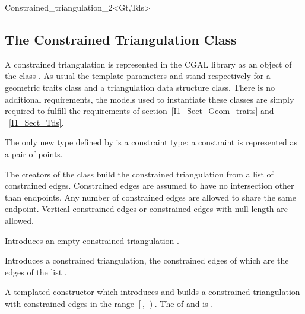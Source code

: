\begin{ccClassTemplate} {Constrained_triangulation_2<Gt,Tds>}
\subsection{ The Constrained Triangulation  Class}
A constrained triangulation is represented in the CGAL library as an
object of the class \ccClassTemplateName .
As usual the template parameters  and 
stand respectively for a geometric traits class and
a triangulation data structure class. There is no additional
requirements,
the models used to instantiate these classes are simply required
to fulfill the requirements 
of section~\ref{I1_Sect_Geom_traits} and ~\ref{I1_Sect_Tds}.

 
\ccInheritsFrom


\ccTypes
{}
\ccThreeToTwo
The only new type defined by
\ccClassTemplateName is a constraint type: a
constraint is represented as a pair of points.


\ccCreation
{}

The creators of the class build the constrained triangulation from a
list of constrained edges. Constrained edges are assumed to have no
intersection other than endpoints. Any number of constrained edges are
allowed to share the same endpoint.  Vertical constrained edges or
constrained edges with null length are allowed.

{Introduces an empty constrained triangulation \ccVar.}

{Introduces a constrained triangulation, the constrained edges of which
are the edges of the list .}


{A templated constructor which introduces and builds
 a constrained triangulation with constrained edges in the range 
$\left[\right.$, $\left.\right)$.
\ccPrecond The  of  and 
 is .}



\end{ccClassTemplate}
